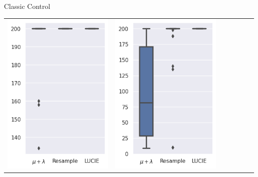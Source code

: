 \begin{frame}{\tcv{} Classic Control}
\begin{table}
\begin{tabular}{ccccccc}
            \includegraphics[width=\figwidth]{images/LUCIE/cartpole/boxplot_cartpole_200.png} &
            \includegraphics[width=\figwidth]{images/LUCIE/cartpole/boxplot_cartpole_400.png} &

\end{tabular}
\end{table}
\end{frame}

